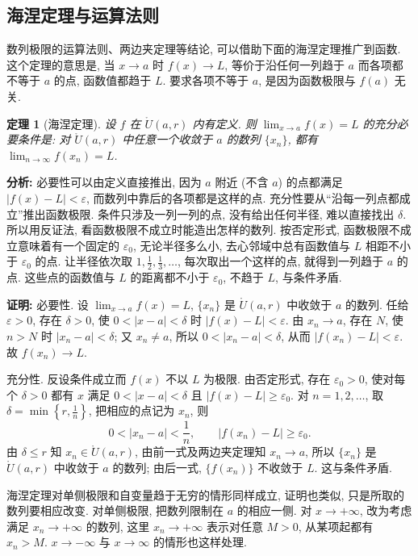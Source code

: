 \documentclass[UTF8,openany]{ctexbook}
\theoremstyle{chinesetextbook}
\newtheorem{theorem}{定理}[section]
\newenvironment{cnproof}{\par\indent\textbf{证明:} \ignorespaces}{\par}
\begin{document}
\subsection{海涅定理与运算法则}
数列极限的运算法则、两边夹定理等结论, 可以借助下面的海涅定理推广到函数. 这个定理的意思是, 当 $x\to a$ 时 $f(x)\to L$, 等价于沿任何一列趋于 $a$ 而各项都不等于 $a$ 的点, 函数值都趋于 $L$. 要求各项不等于 $a$, 是因为函数极限与 $f(a)$ 无关.
\begin{theorem}[海涅定理]
设 $f$ 在 $\mathring U(a,r)$ 内有定义. 则 $\displaystyle\lim_{x\to a}f(x)=L$ 的充分必要条件是: 对 $\mathring U(a,r)$ 中任意一个收敛于 $a$ 的数列 $\{x_n\}$, 都有 $\displaystyle\lim_{n\to\infty}f(x_n)=L$.
\end{theorem}
\par\indent\textbf{分析:} 必要性可以由定义直接推出, 因为 $a$ 附近 (不含 $a$) 的点都满足 $|f(x)-L|<\varepsilon$, 而数列中靠后的各项都是这样的点. 充分性要从“沿每一列点都成立”推出函数极限. 条件只涉及一列一列的点, 没有给出任何半径, 难以直接找出 $\delta$. 所以用反证法, 看函数极限不成立时能造出怎样的数列. 按否定形式, 函数极限不成立意味着有一个固定的 $\varepsilon_0$, 无论半径多么小, 去心邻域中总有函数值与 $L$ 相距不小于 $\varepsilon_0$ 的点. 让半径依次取 $\displaystyle1,\frac12,\frac13,\ldots$, 每次取出一个这样的点, 就得到一列趋于 $a$ 的点. 这些点的函数值与 $L$ 的距离都不小于 $\varepsilon_0$, 不趋于 $L$, 与条件矛盾.
\begin{cnproof}
必要性. 设 $\displaystyle\lim_{x\to a}f(x)=L$, $\{x_n\}$ 是 $\mathring U(a,r)$ 中收敛于 $a$ 的数列. 任给 $\varepsilon>0$, 存在 $\delta>0$, 使 $0<|x-a|<\delta$ 时 $|f(x)-L|<\varepsilon$. 由 $x_n\to a$, 存在 $N$, 使 $n>N$ 时 $|x_n-a|<\delta$; 又 $x_n\ne a$, 所以 $0<|x_n-a|<\delta$, 从而 $|f(x_n)-L|<\varepsilon$. 故 $f(x_n)\to L$.

充分性. 反设条件成立而 $f(x)$ 不以 $L$ 为极限. 由否定形式, 存在 $\varepsilon_0>0$, 使对每个 $\delta>0$ 都有 $x$ 满足 $0<|x-a|<\delta$ 且 $|f(x)-L|\ge\varepsilon_0$. 对 $n=1,2,\ldots$, 取 $\displaystyle\delta=\min\left\{r,\frac1n\right\}$, 把相应的点记为 $x_n$, 则
\[
0<|x_n-a|<\frac1n,\qquad|f(x_n)-L|\ge\varepsilon_0.
\]
由 $\delta\le r$ 知 $x_n\in\mathring U(a,r)$, 由前一式及两边夹定理知 $x_n\to a$, 所以 $\{x_n\}$ 是 $\mathring U(a,r)$ 中收敛于 $a$ 的数列; 由后一式, $\{f(x_n)\}$ 不收敛于 $L$. 这与条件矛盾.
\end{cnproof}
海涅定理对单侧极限和自变量趋于无穷的情形同样成立, 证明也类似, 只是所取的数列要相应改变. 对单侧极限, 把数列限制在 $a$ 的相应一侧. 对 $x\to+\infty$, 改为考虑满足 $x_n\to+\infty$ 的数列, 这里 $x_n\to+\infty$ 表示对任意 $M>0$, 从某项起都有 $x_n>M$. $x\to-\infty$ 与 $x\to\infty$ 的情形也这样处理.
\end{document}
